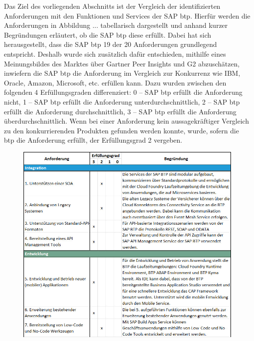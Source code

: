 Das Ziel des vorliegenden Abschnitts ist der Vergleich der identifizierten Anforderungen mit den Funktionen und Services der SAP \ac{btp}. Hierfür werden die Anforderungen in Abbildung ... tabellarisch dargestellt und anhand kurzer Begründungen erläutert, ob die SAP \ac{btp} diese erfüllt. Dabei hat sich herausgestellt, dass die SAP \ac{btp} 19 der 20 Anforderungen grundlegend entspricht. Deshalb wurde sich zusätzlich dafür entschieden, mithilfe eines Meinungsbildes des Marktes über Gartner Peer Insights und G2 abzuschätzen, inwiefern die SAP \ac{btp} die Anforderung im Vergleich zur Konkurrenz wie IBM, Oracle, Amazon, Microsoft, etc. erfüllen kann. Dazu wurden zwischen den folgenden 4 Erfüllungsgraden differenziert: 0 – SAP \ac{btp} erfüllt die Anforderung nicht, 1 – SAP \ac{btp} erfüllt die Anforderung unterdurchschnittlich, 2 – SAP \ac{btp} erfüllt die Anforderung durchschnittlich, 3 – SAP \ac{btp} erfüllt die Anforderung überdurchschnittlich. Wenn bei einer Anforderung kein aussagekräftiger Vergleich zu den konkurrierenden Produkten gefunden werden konnte, wurde, sofern die \ac{btp} die Anforderung erfüllt, der Erfüllungsgrad 2 vergeben.

\begin{figure}[ht]
    \centering
    \includegraphics[width=1\textwidth]{img/TTFTeil1E2.jpg}
    \label{fig:TTFTeil1}
\end{figure}

